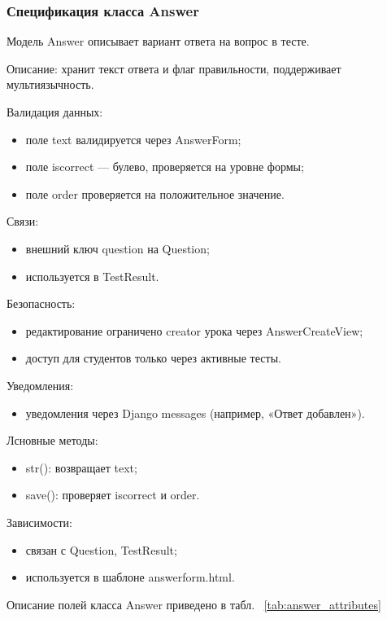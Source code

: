 \subsubsection{Спецификация класса Answer}

Модель Answer описывает вариант ответа на вопрос в тесте.

Описание: хранит текст ответа и флаг правильности, поддерживает мультиязычность.

Валидация данных:
	\begin{itemize}
		\item поле text валидируется через AnswerForm;
		\item поле iscorrect — булево, проверяется на уровне формы;
		\item поле order проверяется на положительное значение.
	\end{itemize}
	
Связи:
	\begin{itemize}
		\item внешний ключ question на Question;
		\item используется в TestResult.
	\end{itemize}
	
Безопасность:
	\begin{itemize}
		\item редактирование ограничено creator урока через AnswerCreateView;
		\item доступ для студентов только через активные тесты.
	\end{itemize}
	
Уведомления:
	\begin{itemize}
		\item уведомления через Django messages (например, «Ответ добавлен»).
	\end{itemize}
	
Лсновные методы:
	\begin{itemize}
		\item str(): возвращает text;
		\item save(): проверяет iscorrect и order.
	\end{itemize}
	
Зависимости:
	\begin{itemize}
		\item связан с Question, TestResult;
		\item используется в шаблоне answerform.html.
	\end{itemize}

Описание полей класса Answer приведено в табл. ~\ref {tab:answer_attributes}

